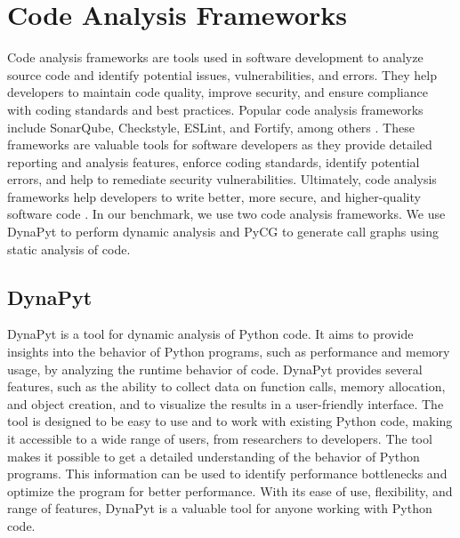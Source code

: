 \section{Code Analysis Frameworks}
Code analysis frameworks are tools used in software development to analyze source code and identify potential issues, vulnerabilities, and errors.
They help developers to maintain code quality, improve security, and ensure compliance with coding standards and best practices.
Popular code analysis frameworks include SonarQube, Checkstyle, ESLint, and Fortify, among others \cite{static_code_analysis_tools}.
These frameworks are valuable tools for software developers as they provide detailed reporting and analysis features, enforce coding standards, identify potential errors, and help to remediate security vulnerabilities.
Ultimately, code analysis frameworks help developers to write better, more secure, and higher-quality software code \cite{Code_analysis_1, Code_analysis_2, static_code_analysis}.
In our benchmark, we use two code analysis frameworks.
We use DynaPyt to perform dynamic analysis and PyCG to generate call graphs using static analysis of code.

\subsection{DynaPyt}
DynaPyt  \cite{DynaPyt2022} is a tool for dynamic analysis of Python code.
It aims to provide insights into the behavior of Python programs, such as performance and memory usage, by analyzing the runtime behavior of code.
DynaPyt provides several features, such as the ability to collect data on function calls, memory allocation, and object creation, and to visualize the results in a user-friendly interface.
The tool is designed to be easy to use and to work with existing Python code, making it accessible to a wide range of users, from researchers to developers.
The tool makes it possible to get a detailed understanding of the behavior of Python programs.
This information can be used to identify performance bottlenecks and optimize the program for better performance.
With its ease of use, flexibility, and range of features, DynaPyt is a valuable tool for anyone working with Python code.

